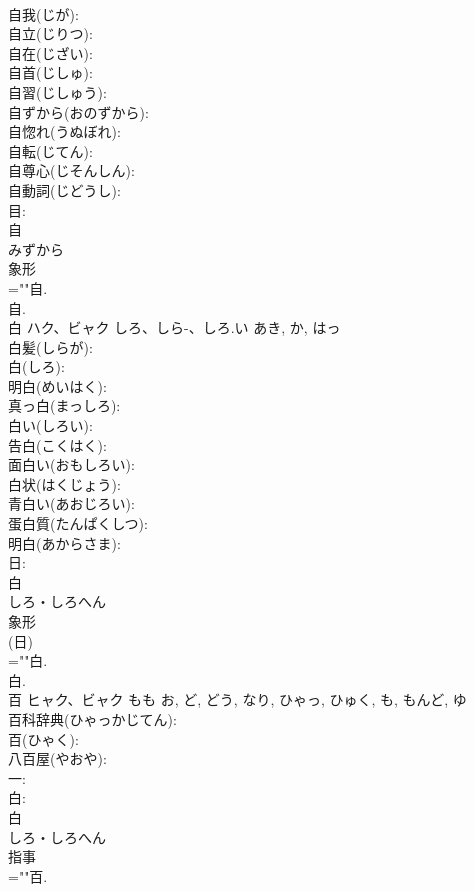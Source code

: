\documentclass[8pt]{extreport}
\begin{document}
\begin{CJK}{UTF8}{min}
\\	自我(じが): 
\\	自立(じりつ): 
\\	自在(じざい): 
\\	自首(じしゅ): 
\\	自習(じしゅう): 
\\	自ずから(おのずから): 
\\	自惚れ(うぬぼれ): 
\\	自転(じてん): 
\\	自尊心(じそんしん): 
\\	自動詞(じどうし): 
\\	目: 
\\	自	
\\	みずから	
\\	象形 
\\	=""自.
\\	自.
\\	白	ハク、ビャク	しろ、しら-、しろ.い	あき, か, はっ	
\\	白髪(しらが): 
\\	白(しろ): 
\\	明白(めいはく): 
\\	真っ白(まっしろ): 
\\	白い(しろい): 
\\	告白(こくはく): 
\\	面白い(おもしろい): 
\\	白状(はくじょう): 
\\	青白い(あおじろい): 
\\	蛋白質(たんぱくしつ): 
\\	明白(あからさま): 
\\	日: 
\\	白	
\\	しろ・しろへん	
\\	象形 
\\	(日) 
\\	=""白.
\\	白.
\\	百	ヒャク、ビャク	もも	お, ど, どう, なり, ひゃっ, ひゅく, も, もんど, ゆ	
\\	百科辞典(ひゃっかじてん): 
\\	百(ひゃく): 
\\	八百屋(やおや): 
\\	一: 
\\	白: 
\\	白	
\\	しろ・しろへん	
\\	指事 
\\	=""百.

\end{CJK}
\end{document}
